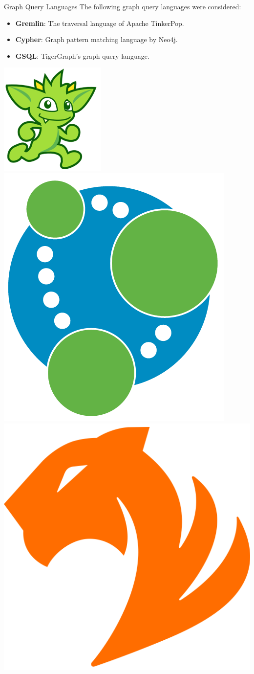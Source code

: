 \begin{frame}{Graph Query Languages}
    The following graph query languages were considered:
    \vfill
    \begin{itemize}
        \item \textbf{Gremlin}: The traversal language of Apache TinkerPop.
        \item \textbf{Cypher}: Graph pattern matching language by Neo4j.
        \item \textbf{GSQL}: TigerGraph's graph query language.
    \end{itemize}
    \vfill
    \includegraphics[width=.25\textwidth]{img/graph-lang/gremlin-running.png}
    \hfill
    \includegraphics[width=.25\textwidth]{img/graph-lang/neo4j.png}
    \hfill
    \includegraphics[width=.25\textwidth]{img/database-logos/tigergraph.png}
\end{frame}

